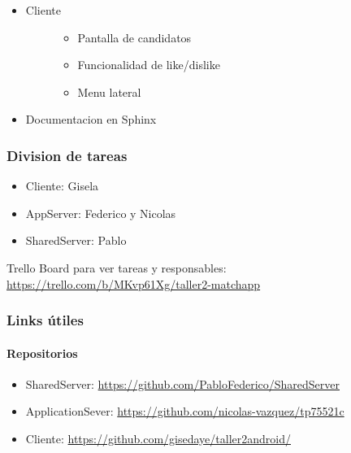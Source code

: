 \documentclass[letterpaper,10pt,english]{sphinxmanual}
\begin{document}
\begin{itemize}
\begin{description}
\end{description}

\item {} \begin{description}
\item[{Cliente}] \leavevmode\begin{itemize}
\item {} 
Pantalla de candidatos

\item {} 
Funcionalidad de like/dislike

\item {} 
Menu lateral

\end{itemize}

\end{description}

\item {} 
Documentacion en Sphinx

\end{itemize}


\subsubsection{Division de tareas}
\label{manuals:id2}\begin{itemize}
\item {} 
Cliente: Gisela

\item {} 
AppServer: Federico y Nicolas

\item {} 
SharedServer: Pablo

\end{itemize}

Trello Board para ver tareas y responsables:
\href{https://trello.com/b/MKvp61Xg/taller2-matchapp}{https://trello.com/b/MKvp61Xg/taller2-matchapp}


\subsubsection{Links útiles}
\label{manuals:id3}

\paragraph{Repositorios}
\label{manuals:id4}\begin{itemize}
\item {} 
SharedServer: \href{https://github.com/PabloFederico/SharedServer}{https://github.com/PabloFederico/SharedServer}

\item {} 
ApplicationSever: \href{https://github.com/nicolas-vazquez/tp75521c}{https://github.com/nicolas-vazquez/tp75521c}

\item {} 
Cliente: \href{https://github.com/gisedaye/taller2android/}{https://github.com/gisedaye/taller2android/}

\end{itemize}
\end{document}
